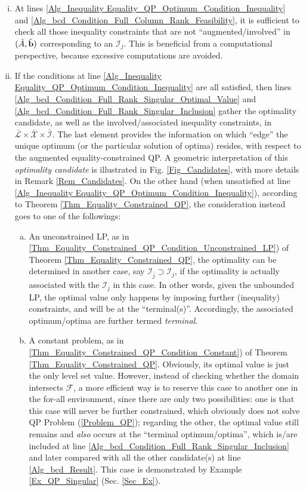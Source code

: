 \documentclass{imaman}
\newcommand{\bfb}{{\bf b}}
\newcommand{\calF}{{\mathcal F}}
\newcommand{\calI}{{\mathcal I}}
\newcommand{\calL}{{\mathcal L}}
\newcommand{\calX}{{\mathcal X}}
\numberwithin{equation}{section}
\begin{document}
\begin{enumerate}[i)]
\item At lines \ref{Alg_Inequality Equality_QP_Optimum_Condition_Inequality} and \ref{Alg_bcd_Condition_Full_Column_Rank_Feasibility}, it is sufficient to check all those inequality constraints that are not ``augmented/involved'' in $(\tilde A,\tilde\bfb)$ corresponding to an $\calI_j$. This is beneficial from a computational perspective, because excessive computations are avoided.
\item If the conditions at line \ref{Alg_Inequality Equality_QP_Optimum_Condition_Inequality} are all satisfied, then lines \ref{Alg_bcd_Condition_Full_Rank_Singular_Optimal_Value} and \ref{Alg_bcd_Condition_Full_Rank_Singular_Inclusion} gather the optimality candidate, as well as the involved/associated inequality constraints, in $\bar\calL\times\bar\calX\times\bar\calI$. The last element provides the information on which ``edge'' the unique optimum (or the particular solution of optima) resides, with respect to the augmented equality-constrained QP. A geometric interpretation of this \textit{optimality candidate} is illustrated in Fig. \ref{Fig_Candidates}, with more details in Remark \ref{Rem_Candidates}. On the other hand (when unsatisfied at line \ref{Alg_Inequality Equality_QP_Optimum_Condition_Inequality}), according to Theorem \ref{Thm_Equality_Constrained_QP}, the consideration instead goes to one of the followings:
    \begin{enumerate}[a)]
    \item\label{App_Proof_QP_bcd_LP} An unconstrained LP, as in \ref{Thm_Equality_Constrained_QP_Condition_Unconstrained_LP}) of Theorem \ref{Thm_Equality_Constrained_QP}, the optimality can be determined in another case, say $\calI_{\bar j}\supset\calI_j$, if the optimality is actually associated with the $\calI_j$ in this case. In other words, given the unbounded LP, the optimal value only happens by imposing further (inequality) constraints, and will be at the ``terminal(s)''. Accordingly, the associated optimum/optima are further termed \textit{terminal}.
    \item\label{App_Proof_QP_bcd_Constant} A constant problem, as in \ref{Thm_Equality_Constrained_QP_Condition_Constant}) of Theorem \ref{Thm_Equality_Constrained_QP}. Obviously, its optimal value is just the only level set value. However, instead of checking whether the domain intersects $\calF$, a more efficient way is to reserve this case to another one in the for-all environment, since there are only two possibilities: one is that this case will never be further constrained, which obviously does not solve QP Problem (\ref{Problem_QP}); regarding the other, the optimal value still remains and \textit{also} occurs at the ``terminal optimum/optima'', which is/are included at line \ref{Alg_bcd_Condition_Full_Rank_Singular_Inclusion} and later compared with all the other candidate(s) at line \ref{Alg_bcd_Result}. This case is demonstrated by Example \ref{Ex_QP_Singular} (Sec. \ref{Sec_Ex}).

\end{enumerate}
\end{enumerate}
\end{document}
